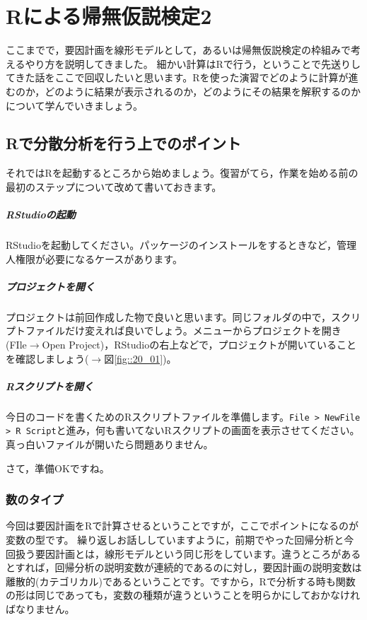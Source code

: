 \documentclass{ltjsarticle}
\begin{document}
\chapter{Rによる帰無仮説検定2}
\label{chapter23}
ここまでで，要因計画を線形モデルとして，あるいは帰無仮説検定の枠組みで考えるやり方を説明してきました。
細かい計算はRで行う，ということで先送りしてきた話をここで回収したいと思います。Rを使った演習でどのように計算が進むのか，どのように結果が表示されるのか，どのようにその結果を解釈するのかについて学んでいきましょう。
\section{Rで分散分析を行う上でのポイント}
それではRを起動するところから始めましょう。復習がてら，作業を始める前の最初のステップについて改めて書いておきます。
\paragraph{RStudioの起動}RStudioを起動してください。パッケージのインストールをするときなど，管理人権限が必要になるケースがあります。
\paragraph{プロジェクトを開く}プロジェクトは前回作成した物で良いと思います。同じフォルダの中で，スクリプトファイルだけ変えれば良いでしょう。メニューからプロジェクトを開き(FIle$\to$Open Project)，RStudioの右上などで，プロジェクトが開いていることを確認しましょう($\to$図\ref{fig::20_01})。
\paragraph{Rスクリプトを開く}今日のコードを書くためのRスクリプトファイルを準備します。\verb|File > NewFile > R Script|と進み，何も書いてないRスクリプトの画面を表示させてください。真っ白いファイルが開いたら問題ありません。

さて，準備OKですね。
\subsection{数のタイプ}
今回は要因計画をRで計算させるということですが，ここでポイントになるのが変数の型です。
繰り返しお話ししていますように，前期でやった回帰分析と今回扱う要因計画とは，線形モデルという同じ形をしています。違うところがあるとすれば，回帰分析の説明変数が連続的であるのに対し，要因計画の説明変数は離散的(カテゴリカル)であるということです。ですから，Rで分析する時も関数の形は同じであっても，変数の種類が違うということを明らかにしておかなければなりません。
\end{document}
